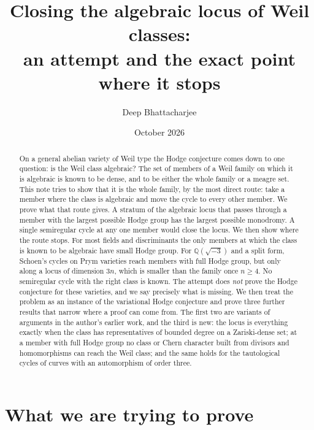 \documentclass[11pt]{amsart}
\title[Closing the algebraic locus of Weil classes]{Closing the algebraic locus of Weil classes:\\
an attempt and the exact point where it stops}
\author{Deep Bhattacharjee}
\date{October 2026}
\theoremstyle{definition}
\theoremstyle{remark}
\newcommand{\QQ}{\mathbb{Q}}
\begin{document}
\begin{abstract}
On a general abelian variety of Weil type the Hodge conjecture comes down
to one question: is the Weil class algebraic? The set of members of a Weil
family on which it is algebraic is known to be dense, and to be either the
whole family or a meagre set. This note tries to show that it is the whole
family, by the most direct route: take a member where the class is
algebraic and move the cycle to every other member. We prove what that
route gives. A stratum of the algebraic locus that passes through a member
with the largest possible Hodge group has the largest possible monodromy.
A single semiregular cycle at any one member would close the locus. We then
show where the route stops. For most fields and discriminants the only
members at which the class is known to be algebraic have small Hodge
group. For $\QQ(\sqrt{-3})$ and a split form, Schoen's cycles on Prym
varieties reach members with full Hodge group, but only along a locus of
dimension $3n$, which is smaller than the family once $n\ge4$. No
semiregular cycle with the right class is known. The attempt does \emph{not} prove the Hodge
conjecture for these varieties, and we say precisely what is missing.
We then treat the problem as an instance of the variational Hodge
conjecture and prove three further results that narrow where a proof can
come from. The first two are variants of arguments in the author's
earlier work, and the third is new: the locus is everything exactly when the class has
representatives of bounded degree on a Zariski-dense set; at a member with
full Hodge group no class or Chern character built from divisors and
homomorphisms can reach the Weil class; and the same holds for the
tautological cycles of curves with an automorphism of order three.
\end{abstract}

\maketitle

\section{What we are trying to prove}
\end{document}
